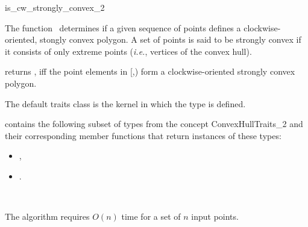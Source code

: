 

\begin{ccRefFunction}{is_cw_strongly_convex_2}  

\ccDefinition
  
The function \ccRefName\ determines if a given sequence of points defines
a clockwise-oriented, stongly convex polygon.  
A set of points is said to be strongly convex %
 if it consists of only extreme points
(\textit{i.e.}, vertices of the convex hull).



           {returns , iff the point elements in 
            [,)
            form a clockwise-oriented strongly convex polygon.
           }

The default traits class  is the kernel in which the 
type  is defined.


 contains the following subset of types from
the concept ConvexHullTraits\_2 and their corresponding member
functions that return instances of these types:
            \begin{itemize}
                \item {}, 
                \item {}.
            \end{itemize}


\ccSeeAlso

 \\

\ccImplementation
The algorithm requires $O(n)$ time for a set of $n$ input points.

\end{ccRefFunction}


